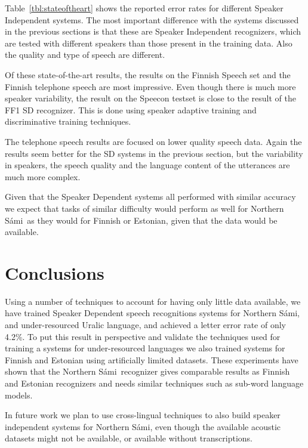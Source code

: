 \documentclass[b5paper]{article}
\newcommand{\todo}[2]{{\textcolor{red}{\bf [#1] #2 }}}
\newcommand{\ns}{Northern Sámi}
\begin{document}
Table~\ref{tbl:stateoftheart} shows the reported error rates for different Speaker Independent systems. The most important difference with the systems discussed in the previous sections is that these are Speaker Independent recognizers, which are tested with different speakers than those present in the training data. Also the quality and type of speech are different. 

Of these state-of-the-art results, the results on the Finnish Speech set and the Finnish telephone speech are most impressive. Even though there is much more speaker variability, the result on the Speecon testset is close to the result of the FF1 SD recognizer. This is done using speaker adaptive training and discriminative training techniques. 

The telephone speech results are focused on lower quality speech data. Again the results seem better for the SD systems in the previous section, but the variability in speakers, the speech quality and the language content of the utterances are much more complex. 

Given that the Speaker Dependent systems all performed with similar accuracy we expect that tasks of similar difficulty would perform as well for \ns\ as they would for Finnish or Estonian, given that the data would be available.




\section{Conclusions} 
Using a number of techniques to account for having only little data available, we have trained Speaker Dependent speech recognitions systems for \ns, and under-resourced Uralic language, and achieved a letter error rate of only 4.2\%. To put this result in perspective and validate the techniques used for training a systems for under-resourced languages we also trained systems for Finnish and Estonian using artificially limited datasets. These experiments have shown that the \ns\ recognizer gives comparable results as Finnish and Estonian recognizers and needs similar techniques such as sub-word language models.


In future work we plan to use cross-lingual techniques to also build speaker independent systems for \ns, even though the available acoustic datasets might not be available, or available without transcriptions.
\end{document}

